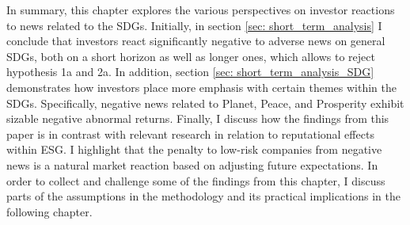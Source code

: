 In summary, this chapter explores the various perspectives on investor reactions to news related to the SDGs. Initially, in section \ref{sec: short_term_analysis} I conclude that investors react significantly negative to adverse news on general SDGs, both on a short horizon as well as longer ones, which allows to reject hypothesis 1a and 2a. In addition, section \ref{sec: short_term_analysis_SDG} demonstrates how investors place more emphasis with certain themes within the SDGs. Specifically, negative news related to Planet, Peace, and Prosperity exhibit sizable negative abnormal returns. Finally, I discuss how the findings from this paper is in contrast with relevant research in relation to reputational effects within ESG. I highlight that the penalty to low-risk companies from negative news is a natural market reaction based on adjusting future expectations. In order to collect and challenge some of the findings from this chapter, I discuss parts of the assumptions in the methodology and its practical implications in the following chapter. 





